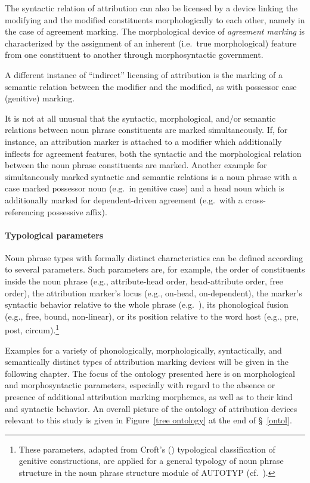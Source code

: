 The syntactic relation of attribution can also be licensed by a device linking the modifying and the modified constituents morphologically to each other, namely in the case of agreement marking. The morphological device of \emph{agreement marking} is characterized by the assignment of an inherent (i.e.~true morphological) feature from one constituent to another through morphosyntactic government.

A different instance of “indirect” licensing of attribution is the marking of a semantic relation between the modifier and the modified, as with possessor case (genitive) marking.

It is not at all unusual that the syntactic, morphological, and/or semantic relations between noun phrase constituents are marked simultaneously. If, for instance, an attribution marker is attached to a modifier which additionally inflects for agreement features, both the syntactic and the morphological relation between the noun phrase constituents are marked. Another example for simultaneously marked syntactic and semantic relations is a noun phrase with a case marked possessor noun (e.g.~in genitive case) and a head noun which is additionally marked for dependent-driven agreement (e.g.~with a cross-referencing possessive affix).

\paragraph{Typological parameters} 
Noun phrase types with formally distinct characteristics can be defined according to several parameters. Such parameters are, for example, the order of constituents inside the noun phrase (e.g., attribute-head order, head-attribute order, free order), the attribution marker's locus (e.g., on-head, on-dependent), the marker's syntactic behavior relative to the whole phrase (e.g.~), its phonological fusion (e.g., free, bound, non-linear), or its position relative to the word host (e.g., pre, post, circum).\footnote{These parameters, adapted from Croft's (\citeyear[93–94]{croft1995}) typological classification of genitive constructions, are applied for a general typology of noun phrase structure in the noun phrase structure module of AUTOTYP (cf.~\citealt{AUTOTYP-NP}).}

Examples for a variety of phonologically, morphologically, syntactically, and semantically distinct types of attribution marking devices will be given in the following chapter. The focus of the ontology presented here is on morphological and morphosyntactic parameters, especially with regard to the absence or presence of additional attribution marking morphemes, as well as to their kind and syntactic behavior. An overall picture of the ontology of attribution devices relevant to this study is given in Figure~\ref{tree ontology} at the end of \S~\ref{ontol}.

